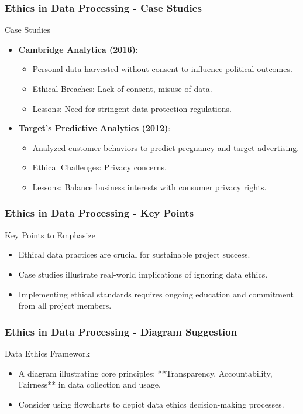 \documentclass[aspectratio=169]{beamer}
\begin{document}
\begin{frame}[fragile]
    \frametitle{Ethics in Data Processing - Case Studies}
    \begin{block}{Case Studies}
        \begin{itemize}
            \item \textbf{Cambridge Analytica (2016)}:
                \begin{itemize}
                    \item Personal data harvested without consent to influence political outcomes.
                    \item Ethical Breaches: Lack of consent, misuse of data.
                    \item Lessons: Need for stringent data protection regulations.
                \end{itemize}
            \item \textbf{Target's Predictive Analytics (2012)}:
                \begin{itemize}
                    \item Analyzed customer behaviors to predict pregnancy and target advertising.
                    \item Ethical Challenges: Privacy concerns.
                    \item Lessons: Balance business interests with consumer privacy rights.
                \end{itemize}
        \end{itemize}
    \end{block}
\end{frame}

\begin{frame}[fragile]
    \frametitle{Ethics in Data Processing - Key Points}
    \begin{block}{Key Points to Emphasize}
        \begin{itemize}
            \item Ethical data practices are crucial for sustainable project success.
            \item Case studies illustrate real-world implications of ignoring data ethics.
            \item Implementing ethical standards requires ongoing education and commitment from all project members.
        \end{itemize}
    \end{block}
\end{frame}

\begin{frame}[fragile]
    \frametitle{Ethics in Data Processing - Diagram Suggestion}
    \begin{block}{Data Ethics Framework}
        \begin{itemize}
            \item A diagram illustrating core principles: **Transparency, Accountability, Fairness** in data collection and usage.
            \item Consider using flowcharts to depict data ethics decision-making processes.
        \end{itemize}
    \end{block}
\end{frame}
\end{document}

